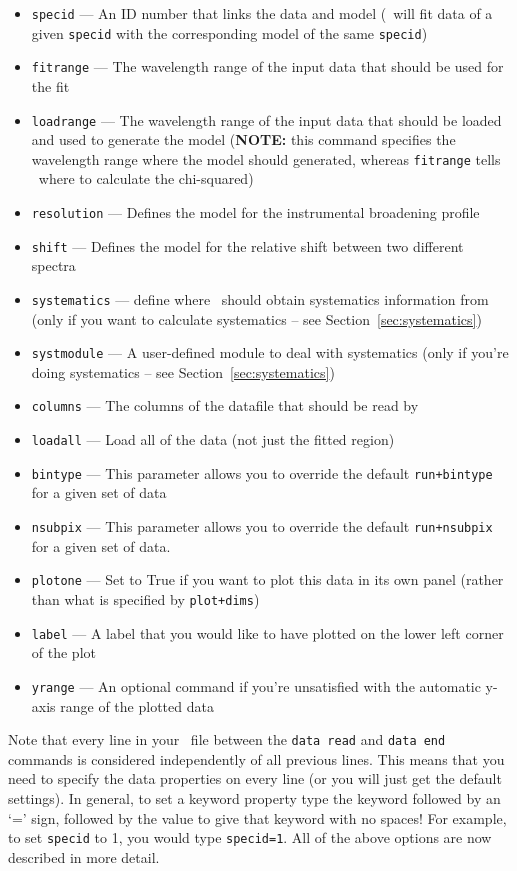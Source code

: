 \begin{itemize}
\item \texttt{specid} --- An ID number that links the data and model (\alis\ will fit data of a given \texttt{specid} with the corresponding model of the same \texttt{specid})
\item \texttt{fitrange} --- The wavelength range of the input data that should be used for the fit
\item \texttt{loadrange} --- The wavelength range of the input data that should be loaded and used to generate the model (\textbf{NOTE:} this command specifies the wavelength range where the model should generated, whereas \texttt{fitrange} tells \alis\ where to calculate the chi-squared)
\item \texttt{resolution} --- Defines the model for the instrumental broadening profile
\item \texttt{shift} --- Defines the model for the relative shift between two different spectra
\item \texttt{systematics} --- define where \alis\ should obtain systematics information from (only if you want to calculate systematics -- see Section~\ref{sec:systematics})
\item \texttt{systmodule} --- A user-defined module to deal with systematics (only if you're doing systematics -- see Section~\ref{sec:systematics})
\item \texttt{columns} --- The columns of the datafile that should be read by \alis\
\item \texttt{loadall} --- Load all of the data (not just the fitted region)
\item \texttt{bintype} --- This parameter allows you to override the default \texttt{run+bintype} for a given set of data
\item \texttt{nsubpix} --- This parameter allows you to override the default \texttt{run+nsubpix} for a given set of data.
\item \texttt{plotone} --- Set to True if you want to plot this data in its own panel (rather than what is specified by \texttt{plot+dims})
\item \texttt{label} --- A label that you would like to have plotted on the lower left corner of the plot
\item \texttt{yrange} --- An optional command if you're unsatisfied with the automatic y-axis range of the plotted data
\end{itemize}

Note that every line
in your \dmod\ file between the \texttt{data read}
and \texttt{data end} commands is considered
independently of all previous lines. This means
that you need to specify the data properties on
every line (or you will just get the default settings).
In general, to set a keyword property type the
keyword followed by an `=' sign, followed by the
value to give that keyword with no spaces! For
example, to set \texttt{specid} to 1, you would
type \texttt{specid=1}. All of the above options
are now described in more detail.

